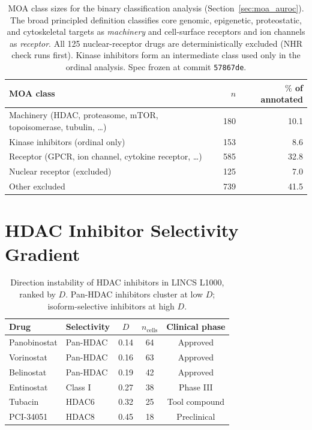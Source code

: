 \documentclass[11pt]{article}
\begin{document}
\begin{table}[h]
\centering
\caption{MOA class sizes for the binary classification analysis
(Section~\ref{sec:moa_auroc}). The broad principled
definition classifies core genomic, epigenetic, proteostatic, and
cytoskeletal targets as \emph{machinery} and cell-surface receptors and
ion channels as \emph{receptor}. All 125 nuclear-receptor drugs are
deterministically excluded (NHR check runs first). Kinase inhibitors
form an intermediate class used only in the ordinal analysis.
Spec frozen at commit \texttt{57867de}.}
\label{tab:moa-broad}
\begin{tabular}{lrr}
\toprule
MOA class & $n$ & $\%$ of annotated \\
\midrule
Machinery (HDAC, proteasome, mTOR, topoisomerase, tubulin, \ldots) & 180 & 10.1 \\
Kinase inhibitors (ordinal only) & 153 & 8.6 \\
Receptor (GPCR, ion channel, cytokine receptor, \ldots) & 585 & 32.8 \\
Nuclear receptor (excluded) & 125 & 7.0 \\
Other excluded & 739 & 41.5 \\
\bottomrule
\end{tabular}
\end{table}

\section{HDAC Inhibitor Selectivity Gradient}
\label{app:hdac}

\begin{table}[h]
\centering
\caption{Direction instability of HDAC inhibitors in LINCS L1000, ranked
by $D$. Pan-HDAC inhibitors cluster at low $D$; isoform-selective
inhibitors at high $D$.}
\begin{tabular}{llccc}
\toprule
Drug & Selectivity & $D$ & $n_{\text{cells}}$ & Clinical phase \\
\midrule
Panobinostat & Pan-HDAC & 0.14 & 64 & Approved \\
Vorinostat & Pan-HDAC & 0.16 & 63 & Approved \\
Belinostat & Pan-HDAC & 0.19 & 42 & Approved \\
Entinostat & Class I & 0.27 & 38 & Phase III \\
Tubacin & HDAC6 & 0.32 & 25 & Tool compound \\
PCI-34051 & HDAC8 & 0.45 & 18 & Preclinical \\
\bottomrule
\end{tabular}
\end{table}
\end{document}
